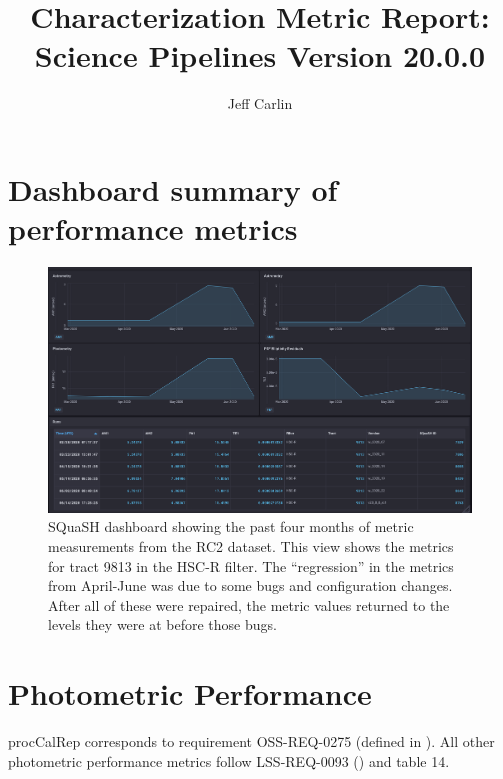 \documentclass[DM,lsstdraft,toc]{lsstdoc}
\title{Characterization Metric Report: Science Pipelines Version 20.0.0}
\author{%
Jeff Carlin
}
\date{\vcsDate}
\begin{document}
\maketitle


\section{Dashboard summary of performance metrics}

\begin{figure}
\includegraphics[width=1.0\columnwidth]{figures/SQuaSH_dashboard_RC2_tract9813.png}
\caption{SQuaSH dashboard showing the past four months of metric measurements from the RC2 dataset. This view shows the metrics for tract 9813 in the HSC-R filter. The ``regression'' in the metrics from April-June was due to some bugs and configuration changes. After all of these were repaired, the metric values returned to the levels they were at before those bugs.}
\end{figure}

\section{Photometric Performance}\label{photometric-performance}

procCalRep corresponds to requirement OSS-REQ-0275 (defined in
). All other photometric performance
metrics follow LSS-REQ-0093 () and
 table 14.
\end{document}
